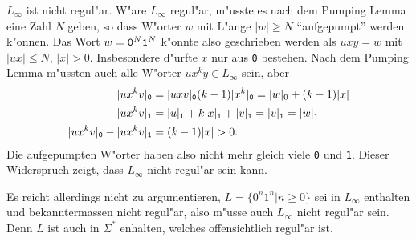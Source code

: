 \begin{loesung}
\begin{teilaufgaben}
\item $L_\infty$ ist nicht regul"ar. W"are $L_\infty$ regul"ar,
m"usste es nach dem Pumping Lemma eine Zahl $N$ geben, so dass
W"orter $w$ mit L"ange $|w|\ge N$ ``aufgepumpt'' werden k"onnen.
Das Wort $w={\tt 0}^N{\tt 1}^N$ k"onnte also geschrieben werden
als $uxy=w$ mit $|ux|\le N$, $|x|>0$. Insbesondere d"urfte $x$ nur
aus {\tt 0} bestehen. Nach dem Pumping Lemma m"ussten auch alle
W"orter $ux^ky\in L_\infty$ sein, aber
\begin{align*}
|ux^kv|_{\tt 0}
&=
|uxv|_{\tt 0}
(k-1) |x^k|_{\tt 0}
=
|w|_0+(k-1)|x|
\\
|ux^kv|_{\tt 1}
&=
|u|_{\tt 1} + k|x|_{\tt 1} + |v|_{\tt 1}
=
|v|_{\tt 1}
=|w|_{\tt 1}
\\
|ux^kv|_{\tt 0}
-
|ux^kv|_{\tt 1}
&=
(k-1)|x|>0.
\end{align*}
Die aufgepumpten W"orter haben also nicht mehr gleich viele
{\tt 0} und {\tt 1}. Dieser Widerspruch zeigt, dass $L_\infty$
nicht regul"ar sein kann.

Es reicht allerdings nicht zu argumentieren, $L=\{ 0^n1^n|n \ge 0\}$
sei in $L_\infty$ enthalten und bekanntermassen nicht regul"ar,
also m"usse auch $L_\infty$ nicht regul"ar sein. Denn $L$ ist auch
in $\Sigma^*$ enhalten, welches offensichtlich regul"ar ist.
\end{teilaufgaben}
\end{loesung}


